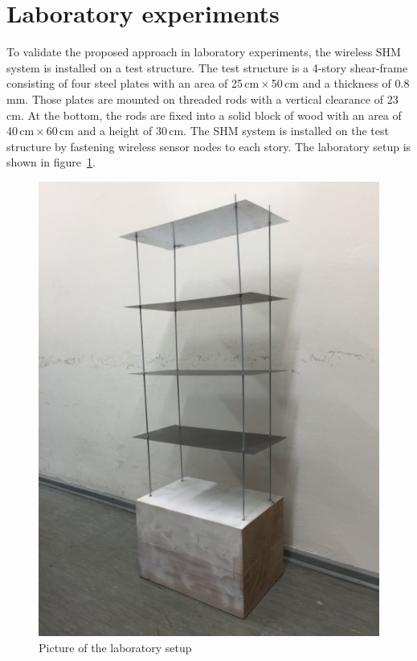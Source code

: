 \documentclass[12pt,a4paper]{scrartcl}
\begin{document}
	
	\newpage
	\section*{Laboratory experiments}
	
	
	To validate the proposed approach in laboratory experiments, the wireless SHM system is installed on a test structure.
	The test structure is a 4-story shear-frame consisting of four steel plates with an area of 25\,cm\,$\times$\,50\,cm and a thickness of 0.8\,mm.
	Those plates are mounted on threaded rods with a vertical clearance of 23\,cm.
	At the bottom, the rods are fixed into a solid block of wood with an area of 40\,cm\,$\times$\,60\,cm and a height of 30\,cm.
	The SHM system is installed on the test structure by fastening wireless sensor nodes to each story.
	The laboratory setup is shown in figure~\ref{fig:teststructure}.
	
	\begin{figure}[h!]
		\centering
		\includegraphics[scale=0.3]{figures/teststructure.jpg}
		\caption{Picture of the laboratory setup}
		\label{fig:teststructure}
	\end{figure}
	
\end{document}
